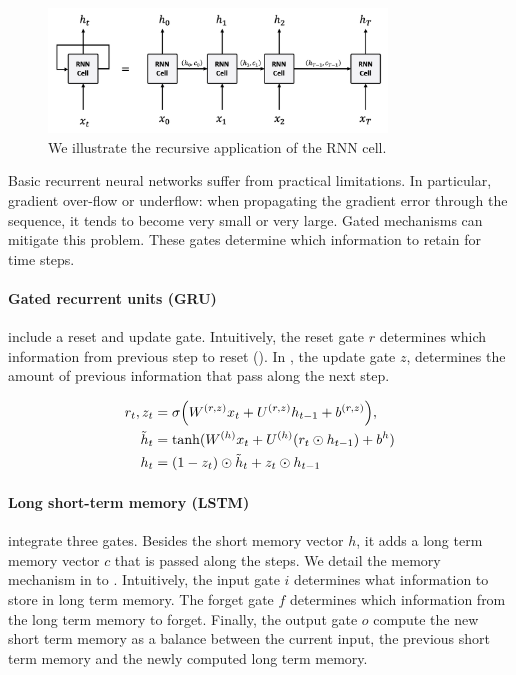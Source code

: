 \begin{figure}[!ht]
	\includegraphics[width=9cm]{images/rnn_cell_unfold.png}
	\caption[RNN cell unfold]{We illustrate the recursive application of the RNN cell.}
\end{figure}

Basic recurrent neural networks suffer from practical limitations. In particular, gradient over-flow or underflow: when propagating the gradient error through the sequence, it tends to become very small or very large.  Gated mechanisms can mitigate this problem. These gates determine which information to retain for time steps.


\paragraph{Gated recurrent units (GRU)} include a reset and update gate. Intuitively, the reset gate $r$ determines which information from previous step to reset (). In , the update gate $z$, determines the amount of previous information that pass along the next step.

\begin{align}
r_t, z_t &=\sigma \Big( W^{(r, z)} x_t + U^{(r, z)} h_{t-1} + b^{(r, z)} \Big), \labeq{gru-def-first}\\
\tilde{h}_t &= \tanh(W^{(h)} x_t + U^{(h)} (r_t \odot h_{t-1}) +b^h) \labeq{gru-def-reset} \\
h_t &= (1-z_t) \odot \tilde{h}_t + z_t \odot h_{t-1} \labeq{gru-def-last}
\end{align}

\paragraph{Long short-term memory (LSTM)} integrate three gates. Besides the short memory vector $h$, it adds a long term memory vector $c$ that is passed along the steps. We detail the memory mechanism in  to . Intuitively, the input gate $i$ determines what information to store in long term memory. The forget gate $f$ determines which information from the long term memory to forget. Finally, the output gate $o$ compute the new short term memory as a balance between the current input, the previous short term memory and the newly computed long term memory.

